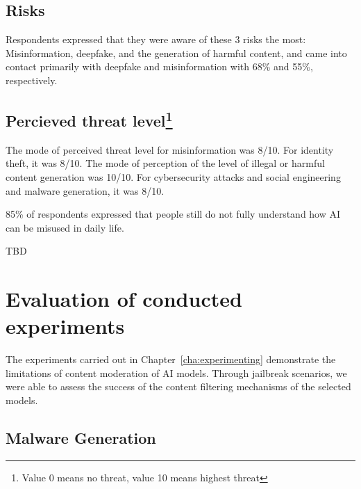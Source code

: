 \subsection*{Risks}

Respondents expressed that they were aware of these 3 risks the most: Misinformation, deepfake, and the generation of harmful content, and came into contact primarily with deepfake and misinformation with 68\% and 55\%, respectively.

\subsection*{Percieved threat level\footnote{Value 0 means no threat, value 10 means highest threat}}

The mode of perceived threat level for misinformation was 8/10.
For identity theft, it was 8/10.
The mode of perception of the level of illegal or harmful content generation was 10/10.
For cybersecurity attacks and social engineering and malware generation, it was 8/10.


85\% of respondents expressed that people still do not fully understand how AI can be misused in daily life.

TBD


    
    
    

\section{Evaluation of conducted experiments}

The experiments carried out in Chapter~\ref{cha:experimenting} demonstrate the limitations of content moderation of AI models. Through jailbreak scenarios, we were able to assess the success of the content filtering mechanisms of the selected models.

\subsection*{Malware Generation}

